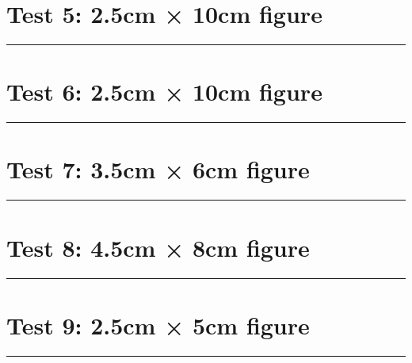 \documentclass[a4paper,11pt]{article}
\begin{document}
\section*{Test 5: 2.5cm × 10cm figure}
\begin{swarmwrap}%
  \begin{minipage}[t]{2cm}
    \centering
    \rule{\linewidth}{10cm}
  \end{minipage}%
\end{swarmwrap}%
\swarmwrapnext
\lipsum[145]
\lipsum[146]
\lipsum[147]
\section*{Test 6: 2.5cm × 10cm figure}
\begin{swarmwrap}%
  \begin{minipage}[t]{2cm}
    \centering
    \rule{\linewidth}{10cm}
  \end{minipage}%
\end{swarmwrap}%
\swarmwrapnext
\lipsum[58]
\lipsum[59]
\lipsum[60]
\lipsum[61]
\lipsum[62]
\lipsum[63]
\section*{Test 7: 3.5cm × 6cm figure}
\begin{swarmwrap}%
  \begin{minipage}[t]{3cm}
    \centering
    \rule{\linewidth}{6cm}
  \end{minipage}%
\end{swarmwrap}%
\swarmwrapnext
\lipsum[42]
\lipsum[43]
\lipsum[44]
\section*{Test 8: 4.5cm × 8cm figure}
\begin{swarmwrap}%
  \begin{minipage}[t]{4cm}
    \centering
    \rule{\linewidth}{8cm}
  \end{minipage}%
\end{swarmwrap}%
\swarmwrapnext
\lipsum[73]
\lipsum[74]
\lipsum[75]
\lipsum[76]
\lipsum[77]
\section*{Test 9: 2.5cm × 5cm figure}
\begin{swarmwrap}%
  \begin{minipage}[t]{2cm}
    \centering
    \rule{\linewidth}{5cm}
  \end{minipage}%
\end{swarmwrap}%
\swarmwrapnext
\lipsum[28]
\lipsum[29]
\lipsum[30]
\lipsum[31]
\lipsum[32]
\end{document}

